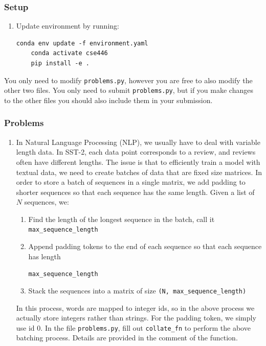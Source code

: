 \documentclass{article}
\begin{document}
\begin{bprob}
\subsubsection*{Setup}
\begin{enumerate}[1.]
    \item Update environment by running:
    \begin{lstlisting}[basicstyle=\ttfamily\small]
    conda env update -f environment.yaml
    conda activate cse446
    pip install -e .
    \end{lstlisting}
\end{enumerate}
You only need to modify \texttt{problems.py}, however you are free to also modify the other two files. You only need to submit
\texttt{problems.py}, but if you make changes to the other files you should also include them in your submission.
\subsubsection*{Problems}
\begin{enumerate}
    \item {} In Natural Language Processing (NLP), we usually have to deal with variable length data. In SST-2, each data point corresponds
    to a review, and reviews often have different lengths. The issue is that to efficiently train a model with textual data, we need
    to create batches of data that are fixed size matrices. In order to store a batch of sequences in a single
    matrix, we add padding to shorter sequences so that each sequence has the same length. Given a list of $N$ sequences, we:
    \begin{enumerate}[1.]
        \item Find the length of the longest sequence in the batch, call it \texttt{max\_sequence\_length}
        \item Append padding tokens to the end of each sequence so that each sequence has length
        
        \texttt{max\_sequence\_length}
        \item Stack the sequences into a matrix of size \texttt{(N, max\_sequence\_length)}
    \end{enumerate}
    In this process, words are mapped to integer ids, so in the above process we actually store integers rather than strings. For the padding token, we simply use
    id $0$. In the file \texttt{problems.py}, fill out \texttt{collate\_fn} to perform the above batching process. Details are provided in the comment of the function.
    

\end{enumerate}
\end{bprob}
\end{document}
